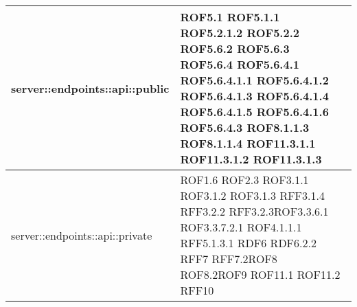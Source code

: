 \begin{center}
\begin{longtable}{| p{9cm} | p{4cm} |}
server::endpoints::api::public  &  ROF5.1 \newline ROF5.1.1 \newline ROF5.2.1.2 \newline ROF5.2.2 \newline ROF5.6.2 \newline ROF5.6.3 \newline ROF5.6.4 \newline ROF5.6.4.1 \newline ROF5.6.4.1.1 \newline ROF5.6.4.1.2 \newline ROF5.6.4.1.3 \newline ROF5.6.4.1.4 \newline ROF5.6.4.1.5 \newline ROF5.6.4.1.6 \newline ROF5.6.4.3 \newline ROF8.1.1.3 \newline  ROF8.1.1.4 \newline ROF11.3.1.1 \newline ROF11.3.1.2 \newline ROF11.3.1.3  \newline \\
\hline
server::endpoints::api::private  & ROF1.6 \newline ROF2.3 \newline ROF3.1.1 \newline ROF3.1.2 \newline ROF3.1.3 \newline RFF3.1.4 \newline RFF3.2.2 \newline RFF3.2.3\newline ROF3.3.6.1 \newline ROF3.3.7.2.1 \newline ROF4.1.1.1 \newline RFF5.1.3.1 \newline RDF6 \newline RDF6.2.2 \newline RFF7 \newline RFF7.2\newline ROF8 \newline ROF8.2\newline ROF9 \newline ROF11.1 \newline ROF11.2  \newline RFF10 \newline \\

\end{longtable}
\end{center}
